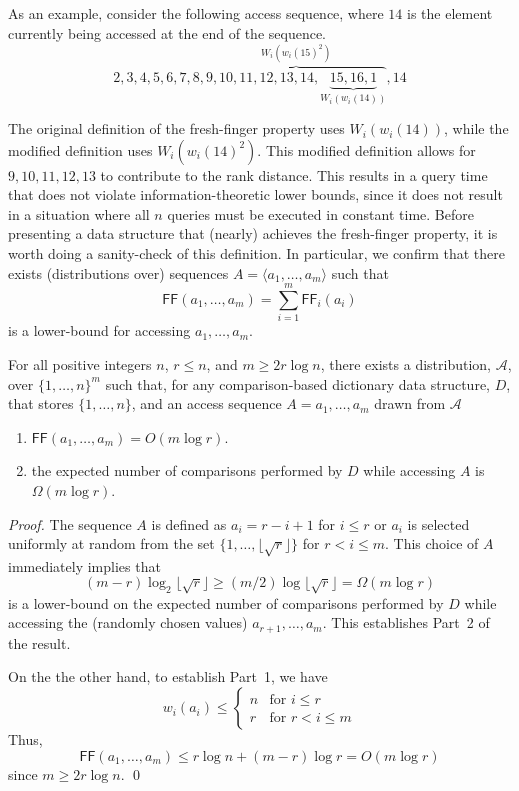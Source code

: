 \documentclass{llncs}
\newcommand{\BigOh}[1]{O\!\left(#1\right)}
\newcommand{\BigOmega}[1]{\Omega\!\left(#1\right)}
\newcommand{\SU}[1]{\textsf{FF}_i\!\left(#1\right)}
\newcommand{\su}[1]{\textsf{FF}\!\left(#1\right)}
\begin{document}
As an example, consider the following access sequence, where $14$ is the element currently being accessed at the end of the sequence.
\begin{displaymath}
2, 3, 4, 5, 6, 7, 8, \overbrace{9, 10, 11, 12, 13, 14, \underbrace{15, 16, 1}_{W_i(w_i(14))}}^{W_i(w_i(15)^2)}, 14
\end{displaymath}

The original definition of the fresh-finger property uses $W_i(w_i(14))$, while the modified definition uses $W_i(w_i(14)^2)$. This modified definition allows for $9,10,11,12,13$ to contribute to the rank distance. This results in a query time that does not violate information-theoretic lower bounds, since it does not result in a situation where all $n$ queries must be executed in constant time. 
Before presenting a data structure that (nearly) achieves the fresh-finger property, it is worth doing a sanity-check of this definition.  In particular, we confirm that there exists (distributions over) sequences $A=\langle a_1,\ldots,a_m \rangle$ such that
\[
   \su{a_1,\ldots,a_m} = \sum_{i=1}^m \SU{a_i}
\]
is a lower-bound for accessing $a_1,\ldots,a_m$.

\begin{theorem}
  For all positive integers $n$, $r\le n$, and $m\ge 2r\log n$, there exists a distribution, $\mathcal{A}$, over $\{1,\ldots,n\}^m$ such that, for any comparison-based dictionary data structure, $D$, that stores $\{1,\ldots,n\}$, and an access sequence $A=a_1,\ldots,a_m$ drawn from $\mathcal{A}$
\begin{enumerate}
 \item $\su{a_1,\ldots,a_m}=\BigOh{m\log r}$.
 \item the expected number of comparisons performed by $D$ while accessing $A$ is $\BigOmega{m\log r}$.
\end{enumerate}
\end{theorem}

\begin{proof}
  The sequence $A$ is defined as $a_i=r-i+1$ for $i\le r$ or $a_i$ is selected
  uniformly at random from the set $\{1,\ldots,\lfloor\sqrt{r}\rfloor\}$ for $r< i\le m$.  This
  choice of $A$ immediately implies that 
  \[
     (m-r)\log_2 \lfloor\sqrt{r}\rfloor\ge (m/2)\log \lfloor\sqrt{r}\rfloor = \BigOmega{m\log r}
  \]
  is a lower-bound on the expected number of comparisons performed by $D$
  while accessing the (randomly chosen values) $a_{r+1},\ldots,a_m$.
  This establishes Part~2 of the result.

  On the the other hand, to establish Part~1, we have
  \[
      w_i(a_i) 
        \le \begin{cases}
          n & \text{for $i\le r$} \\
          r & \text{for $r< i\le m$}
        \end{cases}
  \]
  Thus,
  \[
     \su{a_1,\ldots,a_m} \le r\log n + (m-r)\log r = \BigOh{m\log r}
  \]
  since $m\ge 2r\log n$.  \qed
\end{proof}
\end{document}

